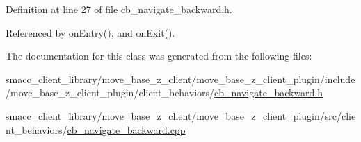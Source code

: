 Definition at line 27 of file cb\+\_\+navigate\+\_\+backward.\+h.



Referenced by on\+Entry(), and on\+Exit().



The documentation for this class was generated from the following files\+:\begin{DoxyCompactItemize}
\item 
smacc\+\_\+client\+\_\+library/move\+\_\+base\+\_\+z\+\_\+client/move\+\_\+base\+\_\+z\+\_\+client\+\_\+plugin/include/move\+\_\+base\+\_\+z\+\_\+client\+\_\+plugin/client\+\_\+behaviors/\hyperlink{cb__navigate__backward_8h}{cb\+\_\+navigate\+\_\+backward.\+h}\item 
smacc\+\_\+client\+\_\+library/move\+\_\+base\+\_\+z\+\_\+client/move\+\_\+base\+\_\+z\+\_\+client\+\_\+plugin/src/client\+\_\+behaviors/\hyperlink{cb__navigate__backward_8cpp}{cb\+\_\+navigate\+\_\+backward.\+cpp}\end{DoxyCompactItemize}
